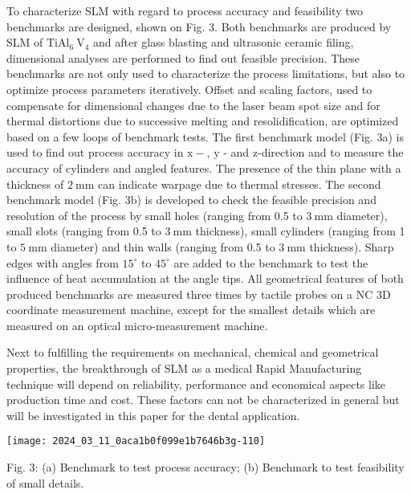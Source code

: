 \documentclass[10pt]{article}
\begin{document}
To characterize SLM with regard to process accuracy and feasibility two benchmarks are designed, shown on Fig. 3. Both benchmarks are produced by SLM of $\mathrm{TiAl}_{6} \mathrm{~V}_{4}$ and after glass blasting and ultrasonic ceramic filing, dimensional analyses are performed to find out feasible precision. These benchmarks are not only used to characterize the process limitations, but also to optimize process parameters iteratively. Offset and scaling factors, used to compensate for dimensional changes due to the laser beam spot size and for thermal distortions due to successive melting and resolidification, are optimized based on a few loops of benchmark tests. The first benchmark model (Fig. 3a) is used to find out process accuracy in $\mathrm{x}-$, $\mathrm{y}$ - and $\mathrm{z}$-direction and to measure the accuracy of cylinders and angled features. The presence of the thin plane with a thickness of $2 \mathrm{~mm}$ can indicate warpage due to thermal stresses. The second benchmark model (Fig. 3b) is developed to check the feasible precision and resolution of the process by small holes (ranging from 0.5 to $3 \mathrm{~mm}$ diameter), small slots (ranging from 0.5 to $3 \mathrm{~mm}$ thickness), small cylinders (ranging from 1 to $5 \mathrm{~mm}$ diameter) and thin walls (ranging from 0.5 to $3 \mathrm{~mm}$ thickness). Sharp edges with angles from $15^{\circ}$ to $45^{\circ}$ are added to the benchmark to test the influence of heat accumulation at the angle tips. All geometrical features of both produced benchmarks are measured three times by tactile probes on a NC 3D coordinate measurement machine, except for the smallest details which are measured on an optical micro-measurement machine.

Next to fulfilling the requirements on mechanical, chemical and geometrical properties, the breakthrough of SLM as a medical Rapid Manufacturing technique will depend on reliability, performance and economical aspects like production time and cost. These factors can not be characterized in general but will be investigated in this paper for the dental application.

\begin{center}
\texttt{[image: 2024\_03\_11\_0aca1b0f099e1b7646b3g-110]}
\end{center}

Fig. 3: (a) Benchmark to test process accuracy; (b) Benchmark to test feasibility of small details.
\end{document}
